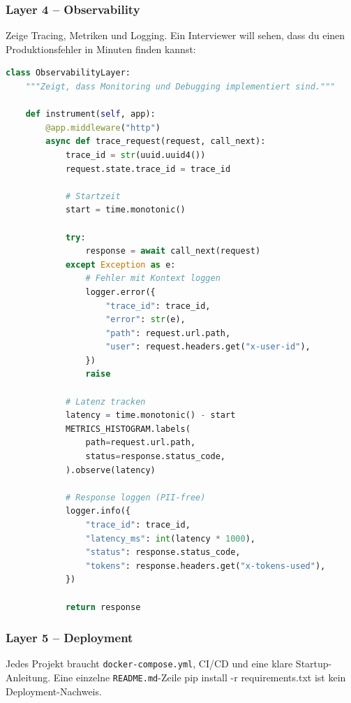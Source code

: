 \subsubsection{Layer 4 -- Observability}

Zeige Tracing, Metriken und Logging. Ein Interviewer will sehen, dass du einen Produktionsfehler in Minuten finden kannst:

\begin{lstlisting}[language=Python, caption=Observability-Layer im Portfolio]
class ObservabilityLayer:
    """Zeigt, dass Monitoring und Debugging implementiert sind."""

    def instrument(self, app):
        @app.middleware("http")
        async def trace_request(request, call_next):
            trace_id = str(uuid.uuid4())
            request.state.trace_id = trace_id

            # Startzeit
            start = time.monotonic()

            try:
                response = await call_next(request)
            except Exception as e:
                # Fehler mit Kontext loggen
                logger.error({
                    "trace_id": trace_id,
                    "error": str(e),
                    "path": request.url.path,
                    "user": request.headers.get("x-user-id"),
                })
                raise

            # Latenz tracken
            latency = time.monotonic() - start
            METRICS_HISTOGRAM.labels(
                path=request.url.path,
                status=response.status_code,
            ).observe(latency)

            # Response loggen (PII-free)
            logger.info({
                "trace_id": trace_id,
                "latency_ms": int(latency * 1000),
                "status": response.status_code,
                "tokens": response.headers.get("x-tokens-used"),
            })

            return response
\end{lstlisting}

\subsubsection{Layer 5 -- Deployment}

Jedes Projekt braucht \texttt{docker-compose.yml}, CI/CD und eine klare Startup-Anleitung. Eine einzelne \texttt{README.md}-Zeile \glqq pip install -r requirements.txt\grqq{} ist kein Deployment-Nachweis.

